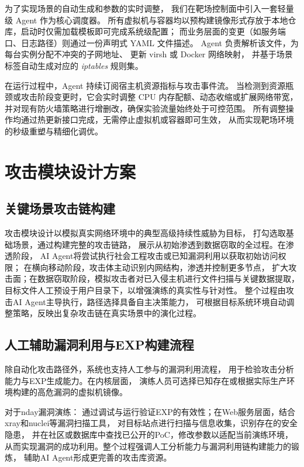 \documentclass[lang=cn,10pt]{elegantbook}
\begin{document}
\begin{proposition}[关于自动化设置的几点说明]

为了实现场景的自动生成和参数的实时调整，
我们在靶场控制面中引入一套轻量级 Agent 作为核心调度器。
所有虚拟机与容器均以预构建镜像形式存放于本地仓库，启动时仅需加载模板即可完成系统级配置；
而业务层面的变更（如服务端口、日志路径）则通过一份声明式 YAML 文件描述。
Agent 负责解析该文件，为每台实例分配不冲突的子网地址、
更新 virsh 或 Docker 网络映射，
并基于场景标签自动生成对应的 \textit{iptables} 规则集。

在运行过程中，Agent 持续订阅宿主机资源指标与攻击事件流。
当检测到资源瓶颈或攻击阶段变更时，它会实时调整 CPU 内存配额、动态收缩或扩展网络带宽，
并对现有防火墙策略进行增删改，确保实验流量始终处于可控范围。
所有调整操作均通过热更新接口完成，无需停止虚拟机或容器即可生效，
从而实现靶场环境的秒级重塑与精细化调优。
\end{proposition}

\section{攻击模块设计方案}

\subsection{关键场景攻击链构建}

攻击模块设计以模拟真实网络环境中的典型高级持续性威胁为目标，
打勾选取基础场景，通过构建完整的攻击链路，
展示从初始渗透到数据窃取的全过程。在渗透阶段，
AI Agent将尝试执行社会工程攻击或已知漏洞利用以获取初始访问权限；
在横向移动阶段，攻击体主动识别内网结构，渗透并控制更多节点，
扩大攻击面；在数据窃取阶段，模拟攻击者对已入侵主机进行文件扫描与关键数据提取，
目标文件人工预设于用户目录下，以增强演练的真实性与针对性。
整个过程由攻击AI Agent主导执行，路径选择具备自主决策能力，
可根据目标系统环境自动调整策略，反映出复杂攻击链在真实场景中的演化过程。

\subsection{人工辅助漏洞利用与EXP构建流程}

除自动化攻击路径外，系统也支持人工参与的漏洞利用流程，
用于检验攻击分析能力与EXP生成能力。在内核层面，
演练人员可选择已知存在或根据实际生产环境构建的高危漏洞的虚拟机镜像。

对于nday漏洞演练：
通过调试与运行验证EXP的有效性；在Web服务层面，结合xray和nuclei等漏洞扫描工具，
对目标站点进行扫描与信息收集，识别存在的安全隐患，
并在社区或数据库中查找已公开的PoC，修改参数以适配当前演练环境，
从而实现漏洞的成功利用。整个过程强调人工分析能力与漏洞利用链构建能力的锻炼，
辅助AI Agent形成更完善的攻击库资源。
\end{document}
